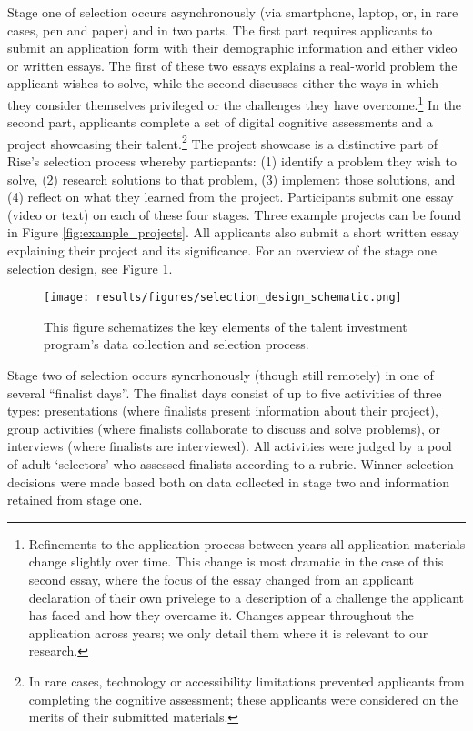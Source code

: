 Stage one of selection occurs asynchronously (via smartphone, laptop, or, in rare cases, pen and paper) and in two parts. The first part requires applicants to submit an application form with their demographic information and either video or written essays. The first of these two essays explains a real-world problem the applicant wishes to solve, while the second discusses either the ways in which they consider themselves privileged or the challenges they have overcome.\footnote{Refinements to the application process between years all application materials change slightly over time. This change is most dramatic in the case of this second essay, where the focus of the essay changed from an applicant declaration of their own privelege to a description of a challenge the applicant has faced and how they overcame it. Changes appear throughout the application across years; we only detail them where it is relevant to our research.} In the second part, applicants complete a set of digital cognitive assessments and a project showcasing their talent.\footnote{In rare cases, technology or accessibility limitations prevented applicants from completing the cognitive assessment; these applicants were considered on the merits of their submitted materials.} The project showcase is a distinctive part of Rise's selection process whereby particpants: (1) identify a problem they wish to solve, (2) research solutions to that problem, (3) implement those solutions, and (4) reflect on what they learned from the project. Participants submit one essay (video or text) on each of these four stages. Three example projects can be found in Figure \ref{fig:example_projects}. All applicants also submit a short written essay explaining their project and its significance. For an overview of the stage one selection design, see Figure \ref{fig:design}.

\begin{figure}[htbp]
    \centering
    \caption{This figure schematizes the key elements of the talent investment program's data collection and selection process. }
    \texttt{[image: results/figures/selection\_design\_schematic.png]} 
    \label{fig:design}
\end{figure}

Stage two of selection occurs syncrhonously (though still remotely) in one of several ``finalist days''. The finalist days consist of up to five activities of three types: presentations (where finalists present information about their project), group activities (where finalists collaborate to discuss and solve problems), or interviews (where finalists are interviewed). All activities were judged by a pool of adult `selectors' who assessed finalists according to a rubric. Winner selection decisions were made based both on data collected in stage two and information retained from stage one.

